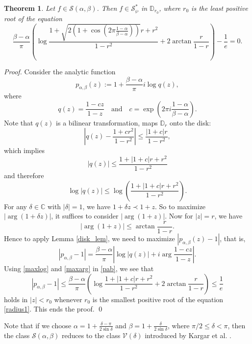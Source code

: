 \documentclass[12pt, reqno]{amsart}
\numberwithin{equation}{section}
\theoremstyle{plain}
\newtheorem{theorem}{Theorem}[section]
\theoremstyle{definition}
\theoremstyle{remark}
\begin{document}
\begin{theorem}\label{1}
	Let $f\in \mathcal{S}(\alpha,\beta)$. Then $f\in \mathcal{S}^*_{\wp}$ in $\mathbb{D}_{r_0}$, where $r_0$ is the least positive root of the equation
	\begin{equation}\label{radius1}
	\frac{\beta-\alpha}{\pi}\left(\log\frac{1+\sqrt{2(1+\cos(2\pi\frac{1-\alpha}{\beta-\alpha}))}r+r^2}{1-r^2}+2\arctan\frac{r}{1-r}\right)-\frac{1}{e}=0.
	\end{equation}
\end{theorem}
\begin{proof}
	Consider the analytic function $$p_{\alpha,\beta}(z):=1+\frac{\beta-\alpha}{\pi}i \log{q(z)},$$
	where $$q(z)=\frac{1-{c}z}{1-z} \quad\text{and}\quad c=\exp\left(2\pi i\frac{1-\alpha}{\beta-\alpha}\right).$$
	Note that $q(z)$ is a bilinear transformation, maps $\mathbb{D}_{r}$ onto the disk:
	$$\left|q(z)-\frac{1+cr^2}{1-r^2}\right|\leq\frac{|1+c|r}{1-r^2},$$
	which implies  
	\begin{equation*}
	|q(z)| 
	\leq\frac{1+|1+c|r+r^2}{1-r^2}
	\end{equation*}
	and therefore
	\begin{equation}\label{maxlog}
	\log|q(z)|\leq \log\left(\frac{1+|1+c|r+r^2}{1-r^2}\right).
	\end{equation}
	For any $\delta\in \mathbb{C}$ with $|\delta|=1$, we have $1+\delta z\prec 1+z$. So to maximize $|\arg(1+\delta z)|$, it suffices to consider $|\arg(1+z)|$. Now for $|z|=r$, we have
	\begin{equation}\label{maxarg}
	|\arg(1+z)|\leq\arctan\frac{r}{1-r}.
	\end{equation}
	Hence to apply Lemma \ref{disk_lem}, we need to maximize $|p_{\alpha,\beta}(z)-1|$, that is,
	\begin{equation}\label{pab}
	|p_{\alpha,\beta}-1|= \frac{\beta-\alpha}{\pi}\left|\log|q(z)|+i\arg\frac{1-cz}{1-z}\right|.
	\end{equation}
	Using \eqref{maxlog} and \eqref{maxarg} in \eqref{pab}, we see that
	\begin{equation*}
	|p_{\alpha,\beta}-1|\leq \frac{\beta-\alpha}{\pi}\left(\log\frac{1+|1+c|r+r^2}{1-r^2}+2\arctan\frac{r}{1-r}\right)\leq\frac{1}{e}
	\end{equation*}
	holds in $|z|<r_0$ whenever $r_0$ is the smallest positive root of the equation \eqref{radius1}. This ends the proof. \qed
\end{proof}	
Note that if we choose $\alpha=1+\frac{\delta-\pi}{2\sin{\delta}}$ and $\beta=1+\frac{\delta}{2\sin{\delta}}$, where $\pi/2\leq\delta<\pi$, then the class $\mathcal{S}(\alpha,\beta)$ reduces to the class $\mathcal{V}(\delta)$ introduced by Kargar et al. \cite{kargar-ebadian}.
\end{document}
